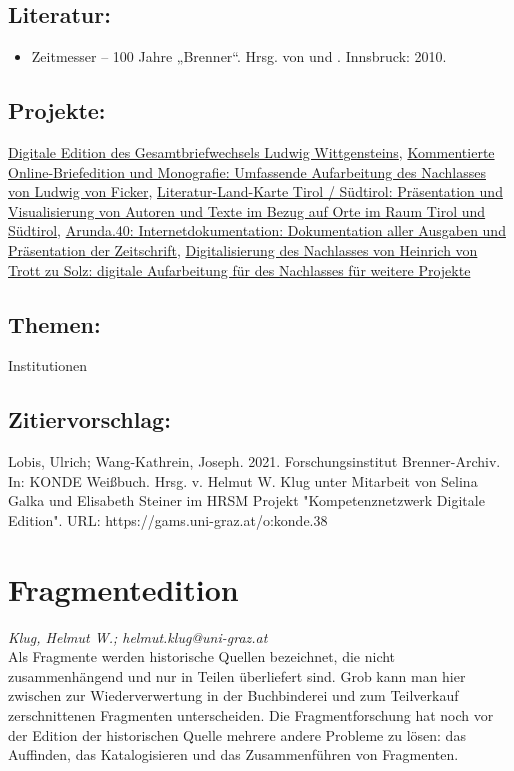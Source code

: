 \documentclass{article}
\begin{document}
        \subsection*{Literatur:}\begin{itemize}\item Zeitmesser – 100 Jahre „Brenner“. Hrsg. von  und  . Innsbruck: 2010.\end{itemize}\subsection*{Projekte:}\href{https://www.uibk.ac.at/brenner-archiv/projekte/wittg_briefe/}{Digitale Edition des Gesamtbriefwechsels Ludwig Wittgensteins}, \href{https://www.uibk.ac.at/brenner-archiv/projekte/ficker_briefed/}{Kommentierte Online-Briefedition und Monografie: Umfassende Aufarbeitung des Nachlasses von Ludwig von Ficker}, \href{https://www.uibk.ac.at/brenner-archiv/projekte/lit_karte_tirol/}{Literatur-Land-Karte Tirol / Südtirol: Präsentation und Visualisierung von Autoren und Texte im Bezug auf Orte im Raum Tirol und Südtirol}, \href{https://www.uibk.ac.at/brenner-archiv/projekte/arunda/}{Arunda.40: Internetdokumentation: Dokumentation aller Ausgaben und Präsentation der Zeitschrift}, \href{https://www.uibk.ac.at/brenner-archiv/projekte/trottzusolz/}{Digitalisierung des Nachlasses von Heinrich von Trott zu Solz: digitale Aufarbeitung für des Nachlasses für weitere Projekte}\subsection*{Themen:}Institutionen\subsection*{Zitiervorschlag:}Lobis, Ulrich; Wang-Kathrein, Joseph. 2021. Forschungsinstitut Brenner-Archiv. In: KONDE Weißbuch. Hrsg. v. Helmut W. Klug unter Mitarbeit von Selina Galka und Elisabeth Steiner im HRSM Projekt "Kompetenznetzwerk Digitale Edition". URL: https://gams.uni-graz.at/o:konde.38\newpage\section*{Fragmentedition} \emph{Klug, Helmut W.; helmut.klug@uni-graz.at }\\
        
    Als Fragmente werden historische Quellen bezeichnet, die nicht zusammenhängend und nur in Teilen überliefert sind. Grob kann man hier zwischen zur Wiederverwertung in der Buchbinderei und zum Teilverkauf zerschnittenen Fragmenten unterscheiden. Die Fragmentforschung hat noch vor der Edition der historischen Quelle mehrere andere Probleme zu lösen: das Auffinden, das Katalogisieren und das Zusammenführen von Fragmenten. \\
            
\end{document}
